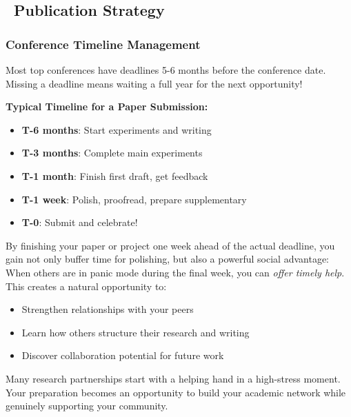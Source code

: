 \documentclass[11pt,a4paper]{article}
\newcommand{\gooditem}{\item[\color{green!70!black}\faCheck]}
\begin{document}
\subsection{\faFile~Publication Strategy}

\subsubsection{Conference Timeline Management}

\begin{tcolorbox}[colback=red!10,colframe=red!50,title=Critical: Plan Your Submissions 6 Months Ahead]
Most top conferences have deadlines 5-6 months before the conference date. Missing a deadline means waiting a full year for the next opportunity!

\textbf{Typical Timeline for a Paper Submission:}
\begin{itemize}
    \item \textbf{T-6 months}: Start experiments and writing
    \item \textbf{T-3 months}: Complete main experiments
    \item \textbf{T-1 month}: Finish first draft, get feedback
    \item \textbf{T-1 week}: Polish, proofread, prepare supplementary
    \item \textbf{T-0}: Submit and celebrate!
\end{itemize}
\end{tcolorbox}

\begin{tcolorbox}[colback=yellow!10,colframe=goldenyellow,title=\faLightbulb~Pro Tip: Set Your Personal Deadline 1 Week Early]
By finishing your paper or project one week ahead of the actual deadline, you gain not only buffer time for polishing, but also a powerful social advantage: When others are in panic mode during the final week, you can \textit{offer timely help}. This creates a natural opportunity to:

\begin{itemize}
    \gooditem Strengthen relationships with your peers
    \gooditem Learn how others structure their research and writing  
    \gooditem Discover collaboration potential for future work
\end{itemize}

Many research partnerships start with a helping hand in a high-stress moment. Your preparation becomes an opportunity to build your academic network while genuinely supporting your community.
\end{tcolorbox}
\end{document}
